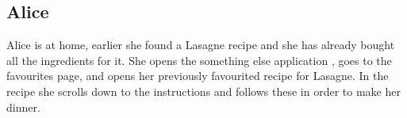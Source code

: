 \subsection*{Alice}
Alice is at home, earlier she found a Lasagne recipe and she has already bought all the ingredients for it. She opens the something else application \appname, goes to the favourites page, and opens her previously favourited recipe for Lasagne. In the recipe she scrolls down to the instructions and follows these in order to make her dinner.
